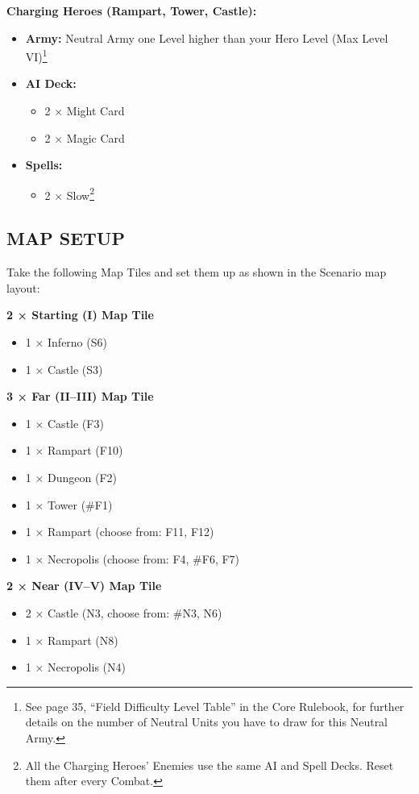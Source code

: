 \begin{multicols*}{2}
\textbf{Charging Heroes (Rampart, Tower, Castle):}
\begin{itemize}
    \item \textbf{Army:}
       Neutral Army one Level higher than your Hero Level (Max Level VI)\footnote{See page 35, ``Field Difficulty Level Table'' in the Core Rulebook, for further details on the number of Neutral Units you have to draw for this Neutral Army.}
    \item \textbf{AI Deck:}
    \begin{itemize}
        \item 2 × Might Card
        \item 2 × Magic Card
    \end{itemize}
    \item \textbf{Spells:}
    \begin{itemize}
        \item 2 × Slow\footnote{All the Charging Heroes' Enemies use the same AI and Spell Decks. Reset them after every Combat.}
    \end{itemize}
\end{itemize}

\subsection*{\MakeUppercase{Map Setup}}

Take the following Map Tiles and set them up as shown in the Scenario map layout:

\textbf{2 × Starting (I) Map Tile}
\begin{itemize}
  \item 1 × Inferno (S6)
  \item 1 × Castle (S3)
\end{itemize}

\textbf{3 × Far (II--III) Map Tile}
\begin{itemize}
  \item 1 × Castle (F3)
  \item 1 × Rampart (F10)
  \item 1 × Dungeon (F2)
  \item 1 × Tower (\#F1)
  \item 1 × Rampart (choose from: F11, F12)
  \item 1 × Necropolis (choose from: F4, \#F6, F7)
\end{itemize}

\textbf{2 × Near (IV--V) Map Tile}
\begin{itemize}
  \item 2 × Castle (N3, choose from: \#N3, N6)
  \item 1 × Rampart (N8)
  \item 1 × Necropolis (N4)
\end{itemize}


\end{multicols*}
